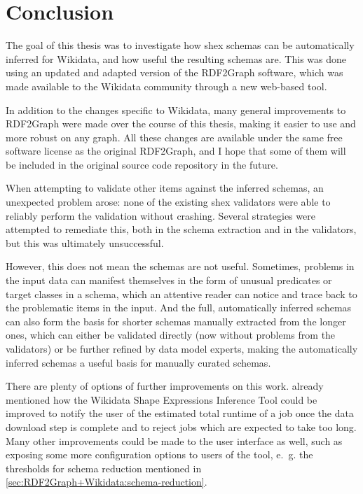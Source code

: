 
\chapter{Conclusion}
\label{ch:Conclusion}

The goal of this thesis was to investigate how \gls{shex} schemas can be automatically inferred for Wikidata,
and how useful the resulting schemas are.
This was done using an updated and adapted version of the RDF2Graph software,
which was made available to the Wikidata community
through a new web-based tool.

In addition to the changes specific to Wikidata,
many general improvements to RDF2Graph were made over the course of this thesis,
making it easier to use and more robust on any graph.
All these changes are available under the same free software license as the original RDF2Graph,
and I hope that some of them will be included in the original source code repository in the future.

When attempting to validate other items against the inferred schemas,
an unexpected problem arose:
none of the existing \gls{shex} validators were able to reliably perform the validation without crashing.
Several strategies were attempted to remediate this,
both in the schema extraction and in the validators,
but this was ultimately unsuccessful.

However, this does not mean the schemas are not useful.
Sometimes, problems in the input data can manifest themselves
in the form of unusual predicates or target classes in a schema,
which an attentive reader can notice and trace back to the problematic items in the input.
And the full, automatically inferred schemas
can also form the basis for shorter schemas manually extracted from the longer ones,
which can either be validated directly
(now without problems from the validators)
or be further refined by data model experts, %
making the automatically inferred schemas a useful basis for manually curated schemas.

There are plenty of options of further improvements on this work.
 already mentioned how the Wikidata Shape Expressions Inference Tool could be improved
to notify the user of the estimated total runtime of a job once the data download step is complete
and to reject jobs which are expected to take too long.
Many other improvements could be made to the user interface as well,
such as exposing some more configuration options to users of the tool,
e.~g. the thresholds for schema reduction mentioned in \cref{sec:RDF2Graph+Wikidata:schema-reduction}.

